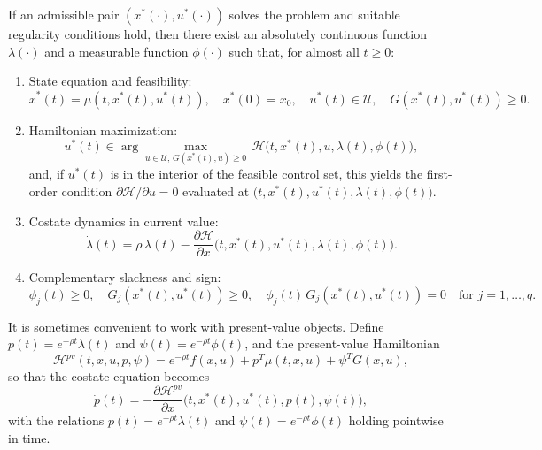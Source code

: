 \documentclass[../../lecture_notes.tex]{subfiles}
\begin{document}
\medskip

If an admissible pair \((x^{\ast}(\cdot), u^{\ast}(\cdot))\) solves the problem and suitable regularity conditions hold, then there exist an absolutely continuous function \(\lambda(\cdot)\) and a measurable function \(\phi(\cdot)\) such that, for almost all \(t\ge 0\):

\begin{enumerate}
\item State equation and feasibility:
\begin{equation*}
  \dot{x}^{\ast}(t)=\mu(t,x^{\ast}(t),u^{\ast}(t)), \quad x^{\ast}(0)=x_{0}, \quad u^{\ast}(t)\in\mathcal{U}, \quad G(x^{\ast}(t),u^{\ast}(t))\ge 0.
\end{equation*}

\item Hamiltonian maximization:
\begin{equation*}
  u^{\ast}(t)\in\arg\max_{u\in\mathcal{U},\,G(x^{\ast}(t),u)\ge 0}\, \mathcal{H}\bigl(t,x^{\ast}(t),u,\lambda(t),\phi(t)\bigr),
\end{equation*}
and, if \(u^{\ast}(t)\) is in the interior of the feasible control set, this yields the first-order condition \(\partial \mathcal{H}/\partial u=0\) evaluated at \(\bigl(t,x^{\ast}(t),u^{\ast}(t),\lambda(t),\phi(t)\bigr)\).

\item Costate dynamics in current value:
\begin{equation*}
  \dot{\lambda}(t)=\rho\,\lambda(t)-\frac{\partial \mathcal{H}}{\partial x}\bigl(t,x^{\ast}(t),u^{\ast}(t),\lambda(t),\phi(t)\bigr).
\end{equation*}

\item Complementary slackness and sign:
\begin{equation*}
  \phi_{j}(t)\ge 0, \quad G_{j}(x^{\ast}(t),u^{\ast}(t))\ge 0, \quad \phi_{j}(t)\,G_{j}(x^{\ast}(t),u^{\ast}(t))=0 \quad \text{for } j=1,\dots,q.
\end{equation*}
\end{enumerate}

It is sometimes convenient to work with present-value objects.
Define \(p(t)=e^{-\rho t}\lambda(t)\) and \(\psi(t)=e^{-\rho t}\phi(t)\), and the present-value Hamiltonian
\begin{equation*}
  \mathcal{H}^{pv}(t,x,u,p,\psi)=e^{-\rho t}f(x,u)+p^{T}\mu(t,x,u)+\psi^{T}G(x,u),
\end{equation*}
so that the costate equation becomes
\begin{equation*}
  \dot{p}(t)=-\frac{\partial \mathcal{H}^{pv}}{\partial x}\bigl(t,x^{\ast}(t),u^{\ast}(t),p(t),\psi(t)\bigr),
\end{equation*}
with the relations \(p(t)=e^{-\rho t}\lambda(t)\) and \(\psi(t)=e^{-\rho t}\phi(t)\) holding pointwise in time.
\end{document}
